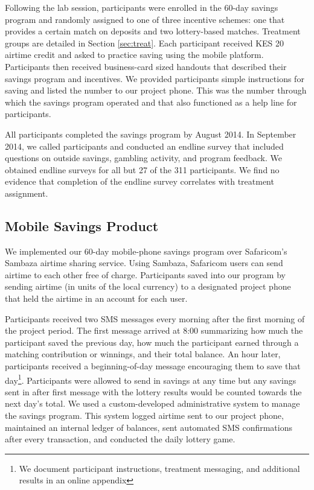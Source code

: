 \documentclass[12pt, titlepage]{article}
\begin{document}
		Following the lab session, participants were enrolled in the 60-day savings program and randomly assigned to one of three incentive schemes: one that provides a certain match on deposits and two lottery-based matches. Treatment groups are detailed in Section \ref{sec:treat}. Each participant received KES 20 airtime credit and asked to practice saving using the mobile platform. Participants then received business-card sized handouts that described their savings program and incentives. We provided participants simple instructions for saving and listed the number to our project phone. This was the number through which the savings program operated and that also functioned as a help line for participants.

		All participants completed the savings program by August 2014. In September 2014, we called participants and conducted an endline survey that included questions on outside savings, gambling activity, and program feedback. We obtained endline surveys for all but 27 of the 311 participants. We find no evidence that completion of the endline survey correlates with treatment assignment.

		\clearpage

	\subsection{Mobile Savings Product}

		We implemented our 60-day mobile-phone savings program over Safaricom's Sambaza airtime sharing service. Using Sambaza, Safaricom users can send airtime to each other free of charge. Participants saved into our program by sending airtime (in units of the local currency) to a designated project phone that held the airtime in an account for each user.

		Participants received two SMS messages every morning after the first morning of the project period. The first message arrived at 8:00 summarizing how much the participant saved the previous day, how much the participant earned through a matching contribution or winnings, and their total balance. An hour later, participants received a beginning-of-day message encouraging them to save that day\footnote{We document participant instructions, treatment messaging, and additional results in an online appendix}. Participants were allowed to send in savings at any time but any savings sent in after first message with the lottery results would be counted towards the next day's total. We used a custom-developed administrative system to manage the savings program. This system logged airtime sent to our project phone, maintained an internal ledger of balances, sent automated SMS confirmations after every transaction, and conducted the daily lottery game.
\end{document}
